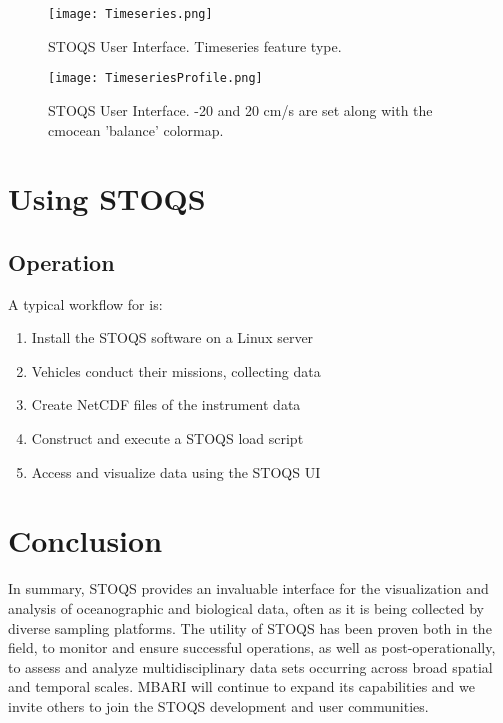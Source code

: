 \documentclass[conference]{IEEEtran}
\begin{document}
\begin{figure*}[htbp]
\centering
\texttt{[image: Timeseries.png]}
\caption{STOQS User Interface. Timeseries feature type.}
\label{fig:Timeseries}
\end{figure*}

\begin{figure*}[htbp]
\centering
\texttt{[image: TimeseriesProfile.png]}
\caption{STOQS User Interface. -20 and 20 cm/s are set along with the cmocean 'balance' colormap.}
\label{fig:Timeseries}
\end{figure*}

\section{Using STOQS}

\subsection{Operation}


A typical workflow for is:
\begin{enumerate}
\item Install the STOQS software on a Linux server
\item Vehicles conduct their missions, collecting data
\item Create NetCDF files of the instrument data
\item Construct and execute a STOQS load script
\item Access and visualize data using the STOQS UI
\end{enumerate}




\section{Conclusion}
In summary, STOQS provides an invaluable interface for the visualization and analysis of oceanographic and biological data, often as it is being collected by diverse sampling platforms.  The utility of STOQS has been proven both in the field, to monitor and ensure successful operations, as well as post-operationally, to assess and analyze multidisciplinary data sets occurring across broad spatial and temporal scales. MBARI will continue to expand its capabilities and we invite others to join the STOQS development and user communities.




\end{document}
